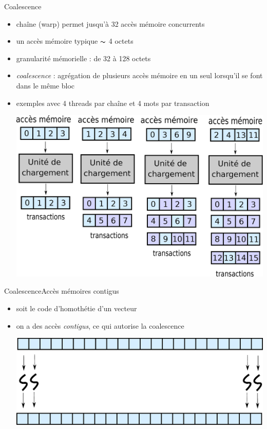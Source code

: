 \documentclass[11pt,mathserif]{beamer}
\newcommand{\argi}{\faLightbulbO}
\newcommand{\adibi}{\faCommentO}
\newcommand{\harritu}{\faExclamation}
\begin{document}
\begin{frame}{Coalescence}
  \begin{itemize}[<+->]
    \item[\argi] chaîne (warp) permet jusqu'à 32 accès mémoire concurrents
    \item[\argi] un accès mémoire typique $\thicksim$ 4 octets
    \item[\argi] granularité mémorielle : de 32 à 128 octets 
    \item[\harritu] {\em coalescence} : agrégation de plusieurs accès mémoire en un seul lorsqu'il se font dans le même bloc
    \item[\adibi] exemples avec 4 threads par chaîne et 4 mots par transaction
\begin{center}
\includegraphics[width=0.6\linewidth]{fig/coalescence.eps}
\end{center}
  \end{itemize}
\end{frame}

\begin{frame}{Coalescence}{Accès mémoires contigus}
  \begin{itemize}[<+->]
    \item[\adibi] soit le code d'homothétie d'un vecteur
\begin{center}

\end{center}
    \item[\argi] on a des accès {\em contigus}, ce qui autorise la coalescence
\begin{center}
  \vspace{0.5cm}
\includegraphics[width=0.8\linewidth]{fig/coalScale.eps}
\end{center}
  \end{itemize}
\end{frame}
\end{document}
